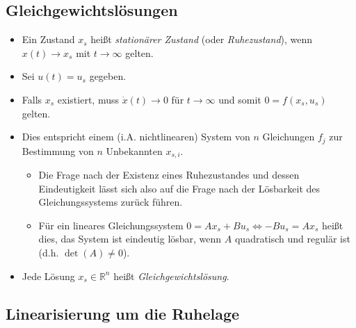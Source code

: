 \documentclass[a4paper, 11pt, accentcolor = tud3b]{tudreport}
\begin{document}
            \subsection{Gleichgewichtslösungen} %
	            \begin{itemize}
	            	\item Ein Zustand \( x _ s \) heißt \textit{stationärer Zustand} (oder \textit{Ruhezustand}), wenn \( x(t) \rightarrow x _ s \) mit \( t \rightarrow \infty \) gelten.
	            	\item Sei \( u(t) = u _ s \) gegeben.
	            	\item Falls \( x _ s \) existiert, muss \( \dot{x}(t) \rightarrow 0 \) für \( t \rightarrow \infty \) und somit \( 0 = f(x _ s, u _ s) \) gelten.
	            	\item Dies entspricht einem (i.A. nichtlinearen) System von \(n\) Gleichungen \(f_j\) zur Bestimmung von \(n\) Unbekannten \(x_{s,i}\).
		            	\begin{itemize}
		            		\item Die Frage nach der Existenz eines Ruhezustandes und dessen Eindeutigkeit lässt sich also auf die Frage nach der Lösbarkeit des Gleichungssystems zurück führen.
		            		\item Für ein lineares Gleichungssystem \( 0 = Ax_s + Bu_s \iff -Bu_s = Ax_s \) heißt dies, das System ist eindeutig lösbar, wenn \(A\) quadratisch und regulär ist (d.h. \( \det(A) \neq 0 \)).
		            	\end{itemize}
	            	\item Jede Lösung \( x _ s \in \mathbb{R} ^ n \) heißt \textit{Gleichgewichtslösung}.
	            \end{itemize}

            \subsection{Linearisierung um die Ruhelage} %
	            \label{sec:linearisierung}
            
\end{document}
